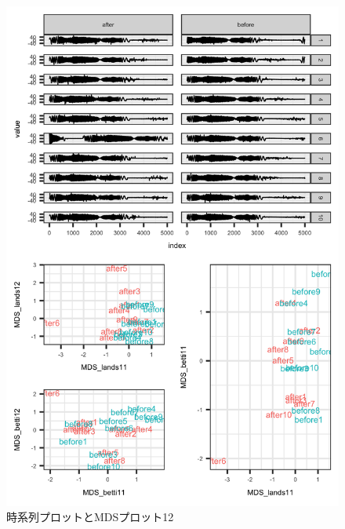 \documentclass{jarticle}
\begin{document}
\begin{figure}[H]
	\begin{center}
		\includegraphics[width=15cm]{fig/MDS_plot12.png}
		\caption{時系列プロットとMDSプロット12}
		\label{fig:MDS_plot12}
	\end{center}
\end{figure}
\end{document}
